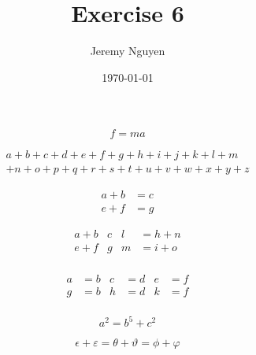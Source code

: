 \documentclass[11pt]{article}
\begin{document}
\title{Exercise 6}
\author{Jeremy Nguyen}
\date{\today}
\maketitle

\begin{equation*}
  f=ma
\end{equation*}

\begin{multline*}
  a+b+c+d+e+f+g+h+i+j+k+l+m\\
  +n+o+p+q+r+s+t+u+v+w+x+y+z
\end{multline*}

\begin{equation}
  \begin{split}
    a+b&=c\\
    e+f&=g
  \end{split}
\end{equation}

\begin{align}
  \label{manyeqs1}
  a+b&c    &    l&=h+n \\
  \label{manyeqs2}
  e+f&g    &    m&=i+o \\
\end{align}


\begin{align*}
  a&=b    &    c&=d  &   e&=f \\
  g&=b    &    h&=d  &  k&=f \\
\end{align*}

\begin{equation}
  a^2=b^5+c^2
\end{equation}

\begin{equation}
  \epsilon+\varepsilon = \theta+\vartheta=\phi+\varphi
\end{equation}
\end{document}

